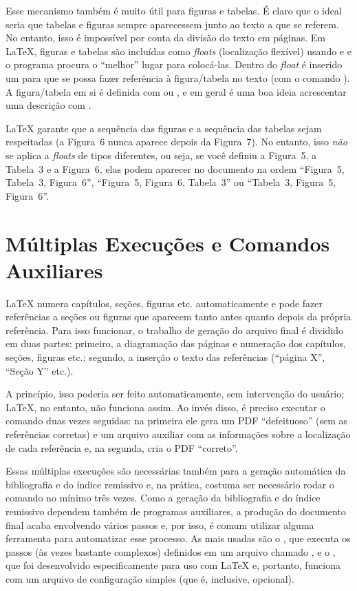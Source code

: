 Esse mecanismo também é muito útil para figuras e tabelas.
É claro que o ideal seria que tabelas e figuras sempre aparecessem junto ao
texto a que se referem. No entanto, isso é impossível por conta da divisão
do texto em páginas. Em \LaTeX{}, figuras e tabelas são incluídas como
\emph{floats} (localização flexível) usando 
e  e o programa procura o ``melhor''
lugar para colocá-las. Dentro do \emph{float} é inserido um
 para que se possa fazer referência à figura/tabela
no texto (com o comando ). A figura/tabela em
si é definida com  ou ,
e em geral é uma boa ideia acrescentar uma descrição com
.

\LaTeX{} garante que a sequência das figuras e a
sequência das tabelas sejam respeitadas (a Figura~6 nunca aparece depois da
Figura~7). No entanto, isso \emph{não} se aplica a \emph{floats} de tipos
diferentes, ou seja, se você definiu a Figura~5, a Tabela~3 e a Figura~6,
elas podem aparecer no documento na ordem ``Figura~5, Tabela~3, Figura~6'',
``Figura~5, Figura~6, Tabela~3'' ou ``Tabela~3, Figura~5, Figura~6''.

\enlargethispage{\baselineskip}

\section{Múltiplas Execuções e Comandos Auxiliares}

\LaTeX{} numera capítulos, seções, figuras etc. automaticamente
e pode fazer referências a seções ou figuras que aparecem tanto antes
quanto depois da própria referência. Para isso funcionar, o trabalho de
geração do arquivo final é dividido em duas partes: primeiro, a diagramação
das páginas e numeração dos capítulos, seções, figuras etc.; segundo, a
inserção o texto das referências (``página X'', ``Seção Y'' etc.).

A princípio, isso poderia ser feito automaticamente, sem intervenção do
usuário; \LaTeX{}, no entanto, não funciona assim. Ao invés disso, é
preciso executar o comando  duas vezes seguidas: na
primeira ele gera um PDF ``defeituoso'' (sem as referências corretas) e
um arquivo auxiliar com as informações sobre a localização de cada
referência e, na segunda, cria o PDF ``correto''.

Essas múltiplas execuções são necessárias também para a geração automática
da bibliografia e do índice remissivo e, na prática, costuma ser necessário
rodar o comando no mínimo três vezes. Como a geração da bibliografia e do
índice remissivo dependem também de programas auxiliares, a produção do
documento final acaba envolvendo vários passos e, por isso, é comum utilizar
alguma ferramenta para automatizar esse processo. As mais usadas são o
, que executa os passos (às vezes bastante complexos) definidos
em um arquivo chamado , e o , que foi
desenvolvido especificamente para uso com \LaTeX{} e, portanto, funciona
com um arquivo de configuração simples (que é, inclusive, opcional).

